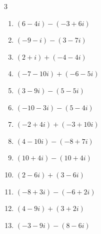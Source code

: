 \begin{multicols}{3}
\begin{enumerate}
        \phantom{$\displaystyle =9-17i$}

  \item $\displaystyle (6-4i) - (-3+6i)$

        \phantom{$\displaystyle =9-10i$}

  \item $\displaystyle (-9-i) - (3-7i)$

        \phantom{$\displaystyle =-12+6i$}

  \item $\displaystyle (2+i) + (-4-4i)$

        \phantom{$\displaystyle =-2-3i$}

  \item $\displaystyle (-7-10i) + (-6-5i)$

        \phantom{$\displaystyle =-13-15i$}

\columnbreak %

  \item $\displaystyle (3-9i) - (5-5i)$

        \phantom{$\displaystyle =-2-4i$}

  \item $\displaystyle (-10-3i) - (5-4i)$

        \phantom{$\displaystyle =-15+i$}

  \item $\displaystyle (-2+4i) + (-3+10i)$

        \phantom{$\displaystyle =-5+14i$}

  \item $\displaystyle (4-10i) - (-8+7i)$

        \phantom{$\displaystyle =12-17i$}

  \item $\displaystyle (10+4i) - (10+4i)$

        \phantom{$\displaystyle =0$}

  \item $\displaystyle (2-6i) + (3-6i)$

        \phantom{$\displaystyle =5-12i$}

  \item $\displaystyle (-8+3i) - (-6+2i)$

        \phantom{$\displaystyle =-2+i$}

  \item $\displaystyle (4-9i) + (3+2i)$

        \phantom{$\displaystyle =7-7i$}

  \item $\displaystyle (-3-9i) - (8-6i)$


\end{enumerate}
\end{multicols}
